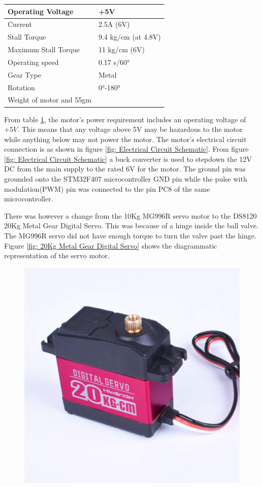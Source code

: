 \begin{itemize}
\begin{table}[H]
\begin{tabular}{|l|l|}
Operating Voltage & +5V \\ \hline
Current & 2.5A (6V) \\ \hline
Stall Torque & 9.4 kg/cm (at 4.8V) \\ \hline
Maximum Stall Torque & 11 kg/cm (6V) \\ \hline
Operating speed & 0.17 s/60° \\ \hline
Gear Type & Metal \\ \hline
Rotation & 0°-180° \\ \hline
Weight of motor and 55gm \\ \hline
\end{tabular}
\label{tab:MG996R_servo_specs}
\end{table}
    
From table \ref{tab:MG996R_servo_specs}, the motor's power requirement includes an operating voltage of $+5V$. This means that any voltage above 5V may be hazardous to the motor while anything below may not power the motor. The motor's electrical circuit connection is as shown in figure \ref{fig: Electrical Circuit Schematic}. From figure  \ref{fig: Electrical Circuit Schematic} a buck converter is used to stepdown the 12V DC from the main supply to the rated 6V for the motor. The ground pin was grounded onto the STM32F407 microcontroller GND pin while the pulse with modulation(PWM) pin was connected to the pin PC8 of the same microcontroller.
\par
There was however a change from the 10Kg MG996R servo motor to the DS8120 20Kg Metal Gear Digital Servo. This was because of a hinge inside the ball valve. The MG996R servo did not have enough torque to turn the valve past the hinge. Figure \ref{fig: 20Kg Metal Gear Digital Servo} shows the diagrammatic representation of the servo motor.
\begin{figure}[H]
\centering
\includegraphics [height=.3\textheight]{Figures/20kg servo.jpg}

\end{figure}
\end{itemize}
